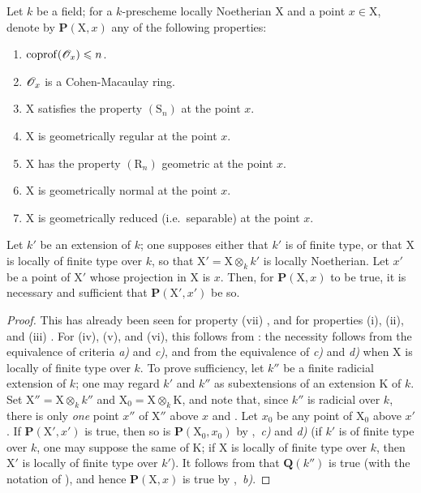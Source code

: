 \begin{corollary}[6.7.8]
\label{IV.6.7.8}
Let $k$ be a field; for a $k$-prescheme locally Noetherian $\mathrm{X}$ and a point $x\in\mathrm{X}$, denote by $\boldsymbol{P}(\mathrm{X},x)$ any of the following properties:
\begin{enumerate}[label=\textup{(\roman*)}]
  \item $\operatorname{coprof}(\mathscr{O}_x)\leqslant n$.
  \item $\mathscr{O}_x$ is a Cohen-Macaulay ring.
  \item $\mathrm{X}$ satisfies the property $(\mathrm{S}_n)$ at the point $x$.
  \item $\mathrm{X}$ is geometrically regular at the point $x$.
  \item $\mathrm{X}$ has the property $(\mathrm{R}_n)$ geometric at the point $x$.
  \item $\mathrm{X}$ is geometrically normal at the point $x$.
  \item $\mathrm{X}$ is geometrically reduced (\textup{i.e.}\ separable) at the point $x$.
\end{enumerate}
Let $k'$ be an extension of $k$; one supposes either that $k'$ is of finite type, or that $\mathrm{X}$ is locally of finite type over $k$, so that $\mathrm{X}'=\mathrm{X}\otimes_k k'$ is locally Noetherian. Let $x'$ be a point of $\mathrm{X}'$ whose projection in $\mathrm{X}$ is $x$. Then, for $\boldsymbol{P}(\mathrm{X},x)$ to be true, it is necessary and sufficient that $\boldsymbol{P}(\mathrm{X}',x')$ be so.
\end{corollary}

\begin{proof}
This has already been seen for property (vii) , and for properties (i), (ii), and (iii) . For (iv), (v), and (vi), this follows from : the necessity follows from the equivalence of criteria \emph{a)} and \emph{c)}, and from the equivalence of \emph{c)} and \emph{d)} when $\mathrm{X}$ is locally of finite type over $k$. To prove sufficiency, let $k''$ be a finite radicial extension of $k$; one may regard $k'$ and $k''$ as subextensions of an extension $\mathrm{K}$ of $k$. Set $\mathrm{X}''=\mathrm{X}\otimes_k k''$ and $\mathrm{X}_0=\mathrm{X}\otimes_k\mathrm{K}$, and note that, since $k''$ is radicial over $k$, there is only \emph{one} point $x''$ of $\mathrm{X}''$ above $x$  and . Let $x_0$ be any point of $\mathrm{X}_0$ above $x'$. If $\boldsymbol{P}(\mathrm{X}',x')$ is true, then so is $\boldsymbol{P}(\mathrm{X}_0,x_0)$ by ,~\emph{c)} and \emph{d)} (if $k'$ is of finite type over $k$, one may suppose the same of $\mathrm{K}$; if $\mathrm{X}$ is locally of finite type over $k$, then $\mathrm{X}'$ is locally of finite type over $k'$). It follows from  that $\boldsymbol{Q}(k'')$ is true (with the notation of ), and hence $\boldsymbol{P}(\mathrm{X},x)$ is true by ,~\emph{b)}.
\end{proof}


